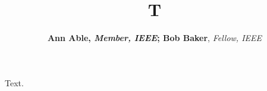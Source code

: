 \documentclass{article}
\begin{document}
\title{T}
\author{\textbf{Ann Able, \textit{Member, IEEE}; Bob Baker}, \textit{Fellow, IEEE}}
\maketitle
Text.
\end{document}

